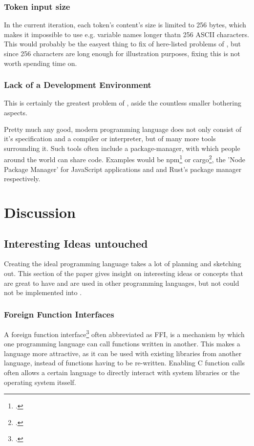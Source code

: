 \documentclass[12pt,a4paper,man]{apa7}
\begin{document}
\subsubsection{Token input size}
In the current iteration, each token's content's size is limited to 256 bytes,
which makes it impossible to use e.g. variable names longer thatn 256 ASCII
characters. This would probably be the easyest thing to fix of here-listed 
problems of \name, but since 256 characters are long enough for 
illustration purposes, fixing this is not worth spending time on.

\subsubsection{Lack of a Development Environment}
This is certainly the greatest problem of \name, aside the countless smaller
bothering aspects.

Pretty much any good, modern programming language does not only consist
of it's specification and a compiler or interpreter, but of many more
tools surrounding it.
Such tools often include a package-manager, with which people around the world
can share code. Examples would be npm\footcite{npm} or cargo\footcite{cargo}, 
the 'Node Package Manager' for JavaScript applications and and Rust's package 
manager respectively.

\section{Discussion}

\subsection{Interesting Ideas untouched}
Creating the ideal programming language takes a lot of planning and sketching
out. This section of the paper gives insight on interesting ideas or concepts
that are great to have and are used in other programming languages, but not 
could not be implemented into \name.

\subsubsection{Foreign Function Interfaces}
A foreign function interface\footcite{FFI} often abbreviated as FFI,
is a mechanism by which one programming language can call functions written 
in another. This makes a language more attractive, as it can be used with
existing libraries from another language, instead of functions having to be
re-written. Enabling C function calls often allows a certain language to
directly interact with system libraries or the operating system itsself.
\end{document}
